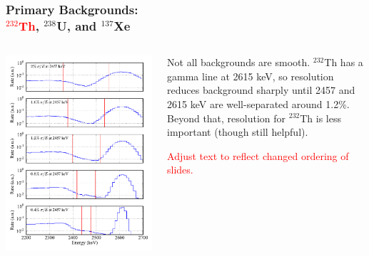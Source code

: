 \documentclass{beamer}
\begin{document}
\begin{frame}
\begin{center}
\frametitle{\hfill Primary Backgrounds:\\\hfill \textcolor{red}{$^{232}$Th}, $^{238}$U, and $^{137}$Xe}
\end{center}
\begin{columns}
\begin{column}{.6\textwidth}
\includegraphics[keepaspectratio=true,width=\textwidth]{Th_Spectra_vs_Res.pdf}
\end{column}
\begin{column}{.4\textwidth}
Not all backgrounds are smooth.  $^{232}$Th has a gamma line at 2615 keV, so resolution reduces background sharply until 2457 and 2615 keV are well-separated around 1.2\%.\\[\baselineskip]

Beyond that, resolution for $^{232}$Th is less important (though still helpful).

\textcolor{red}{Adjust text to reflect changed ordering of slides.}
\end{column}
\end{columns}
\end{frame}
\end{document}

